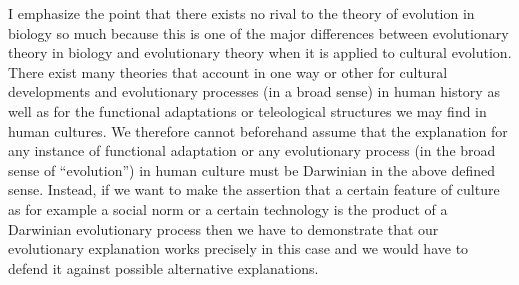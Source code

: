 I emphasize the point that there exists no rival to the theory of evolution in
biology so much because this is one of the major differences between
evolutionary theory in biology and evolutionary theory when it is applied to
cultural evolution. There exist many theories that account in one way or other
for cultural developments and evolutionary processes (in a broad sense) in
human history as well as for the functional adaptations or teleological
structures we may find in human cultures. We therefore cannot beforehand
assume that the explanation for any instance of functional adaptation or any
evolutionary process (in the broad sense of ``evolution'') in human culture
must be Darwinian in the above defined sense. Instead, if we want to make the
assertion that a certain feature of culture as for example a social norm or a
certain technology is the product of a Darwinian evolutionary process then we
have to demonstrate that our evolutionary explanation works precisely in this
case and we would have to defend it against possible alternative explanations.


